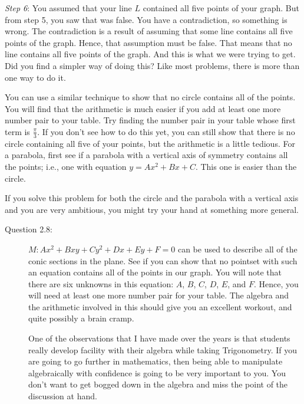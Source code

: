 \documentclass[english]{book}
\begin{document}
\vspace{0.3cm}

\emph{Step 6}: You assumed that your line $L$ contained all five points of your graph. But from step 5, you saw that was false. You have a contradiction, so something is wrong. The contradiction is a result of assuming that some line contains all five points of the graph. Hence, that assumption must be false. That means that no line contains all five points of the graph. And this is what we were trying to get. Did you find a simpler way of doing this? Like most problems, there is more than one way to do it. 

  You can use a similar technique to show that no circle contains all of the points. You will find that the arithmetic is much easier if you add at least one more number pair to your table. Try finding the number pair in your table whose first term is $\frac{\pi}{3}$. If you don't see how to do this yet, you can still show that there is no circle containing all five of your points, but the arithmetic is a little tedious. For a parabola, first see if a parabola with a vertical axis of symmetry contains all the points; i.e., one with equation $y = Ax^{2} + Bx + C$. This one is easier than the circle.

  If you solve this problem for both the circle and the parabola with a vertical axis and you are very ambitious, you might try your hand at something more general.

\begin{description}

\item[Question 2.8:] $M: Ax^{2} + Bxy + Cy^{2} + Dx + Ey + F = 0$ can be used to describe all of the conic sections in the plane. See if you can show that no pointset with such an equation contains all of the points in our graph. You will note that there are six unknowns in this equation: $A$, $B$, $C$, $D$, $E$, and $F$. Hence, you will need at least one more number pair for your table. The algebra and the arithmetic involved in this should give you an excellent workout, and quite possibly a brain cramp.

  One of the observations that I have made over the years is that students really develop facility with their algebra while taking Trigonometry. If you are going to go further in mathematics, then being able to manipulate algebraically with confidence is going to be very important to you. You don't want to get bogged down in the algebra and miss the point of the discussion at hand.

\end{description}
\end{document}
